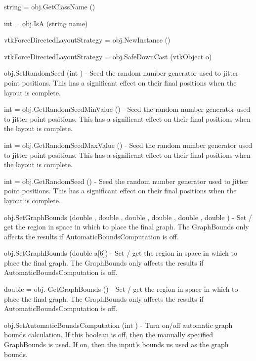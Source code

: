 \begin{DoxyItemize}
\item {\ttfamily string = obj.\-Get\-Class\-Name ()}  
\item {\ttfamily int = obj.\-Is\-A (string name)}  
\item {\ttfamily vtk\-Force\-Directed\-Layout\-Strategy = obj.\-New\-Instance ()}  
\item {\ttfamily vtk\-Force\-Directed\-Layout\-Strategy = obj.\-Safe\-Down\-Cast (vtk\-Object o)}  
\item {\ttfamily obj.\-Set\-Random\-Seed (int )} -\/ Seed the random number generator used to jitter point positions. This has a significant effect on their final positions when the layout is complete.  
\item {\ttfamily int = obj.\-Get\-Random\-Seed\-Min\-Value ()} -\/ Seed the random number generator used to jitter point positions. This has a significant effect on their final positions when the layout is complete.  
\item {\ttfamily int = obj.\-Get\-Random\-Seed\-Max\-Value ()} -\/ Seed the random number generator used to jitter point positions. This has a significant effect on their final positions when the layout is complete.  
\item {\ttfamily int = obj.\-Get\-Random\-Seed ()} -\/ Seed the random number generator used to jitter point positions. This has a significant effect on their final positions when the layout is complete.  
\item {\ttfamily obj.\-Set\-Graph\-Bounds (double , double , double , double , double , double )} -\/ Set / get the region in space in which to place the final graph. The Graph\-Bounds only affects the results if Automatic\-Bounds\-Computation is off.  
\item {\ttfamily obj.\-Set\-Graph\-Bounds (double a\mbox{[}6\mbox{]})} -\/ Set / get the region in space in which to place the final graph. The Graph\-Bounds only affects the results if Automatic\-Bounds\-Computation is off.  
\item {\ttfamily double = obj. Get\-Graph\-Bounds ()} -\/ Set / get the region in space in which to place the final graph. The Graph\-Bounds only affects the results if Automatic\-Bounds\-Computation is off.  
\item {\ttfamily obj.\-Set\-Automatic\-Bounds\-Computation (int )} -\/ Turn on/off automatic graph bounds calculation. If this boolean is off, then the manually specified Graph\-Bounds is used. If on, then the input's bounds us used as the graph bounds.  

\end{DoxyItemize}
